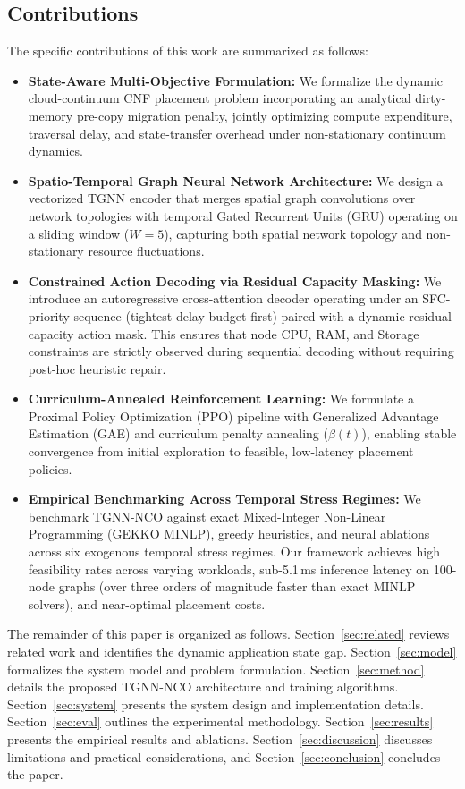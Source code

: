 \documentclass[conference]{IEEEtran}
\begin{document}
\subsection{Contributions}
The specific contributions of this work are summarized as follows:
\begin{itemize}
    \item \textbf{State-Aware Multi-Objective Formulation:} We formalize the dynamic cloud-continuum CNF placement problem incorporating an analytical dirty-memory pre-copy migration penalty, jointly optimizing compute expenditure, traversal delay, and state-transfer overhead under non-stationary continuum dynamics.
    \item \textbf{Spatio-Temporal Graph Neural Network Architecture:} We design a vectorized TGNN encoder that merges spatial graph convolutions over network topologies with temporal Gated Recurrent Units (GRU) operating on a sliding window ($W=5$), capturing both spatial network topology and non-stationary resource fluctuations.
    \item \textbf{Constrained Action Decoding via Residual Capacity Masking:} We introduce an autoregressive cross-attention decoder operating under an SFC-priority sequence (tightest delay budget first) paired with a dynamic residual-capacity action mask. This ensures that node CPU, RAM, and Storage constraints are strictly observed during sequential decoding without requiring post-hoc heuristic repair.
    \item \textbf{Curriculum-Annealed Reinforcement Learning:} We formulate a Proximal Policy Optimization (PPO) pipeline with Generalized Advantage Estimation (GAE) and curriculum penalty annealing ($\beta(t)$), enabling stable convergence from initial exploration to feasible, low-latency placement policies.
    \item \textbf{Empirical Benchmarking Across Temporal Stress Regimes:} We benchmark TGNN-NCO against exact Mixed-Integer Non-Linear Programming (GEKKO MINLP), greedy heuristics, and neural ablations across six exogenous temporal stress regimes. Our framework achieves high feasibility rates across varying workloads, sub-5.1\,ms inference latency on 100-node graphs (over three orders of magnitude faster than exact MINLP solvers), and near-optimal placement costs.
\end{itemize}

The remainder of this paper is organized as follows. Section~\ref{sec:related} reviews related work and identifies the dynamic application state gap. Section~\ref{sec:model} formalizes the system model and problem formulation. Section~\ref{sec:method} details the proposed TGNN-NCO architecture and training algorithms. Section~\ref{sec:system} presents the system design and implementation details. Section~\ref{sec:eval} outlines the experimental methodology. Section~\ref{sec:results} presents the empirical results and ablations. Section~\ref{sec:discussion} discusses limitations and practical considerations, and Section~\ref{sec:conclusion} concludes the paper.
\end{document}
